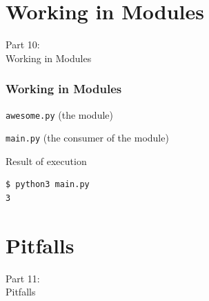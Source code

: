 
\section{Working in Modules}
\begin{frame}
    \vspace{25mm}
    \begin{center}
        \Huge{Part 10:\\Working in Modules}
    \end{center}
\end{frame}

\begin{frame}[fragile]
    \frametitle{Working in Modules}
    \vspace{0mm}
    \begin{center}
      \texttt{awesome.py} (the module)
    \end{center}
    \contentModulesI
    \pause
    
    \vspace{5mm}
    \begin{center}
      \texttt{main.py} (the consumer of the module)
    \end{center}
    \contentModulesII
    \pause
    
    \vspace{5mm}
    \begin{center}
      Result of execution
    \end{center}
    \begin{verbatim}
$ python3 main.py
3
    \end{verbatim}
\end{frame}


\section{Pitfalls}
\begin{frame}
    \vspace{25mm}
    \begin{center}
        \Huge{Part 11:\\Pitfalls}
    \end{center}
\end{frame}

